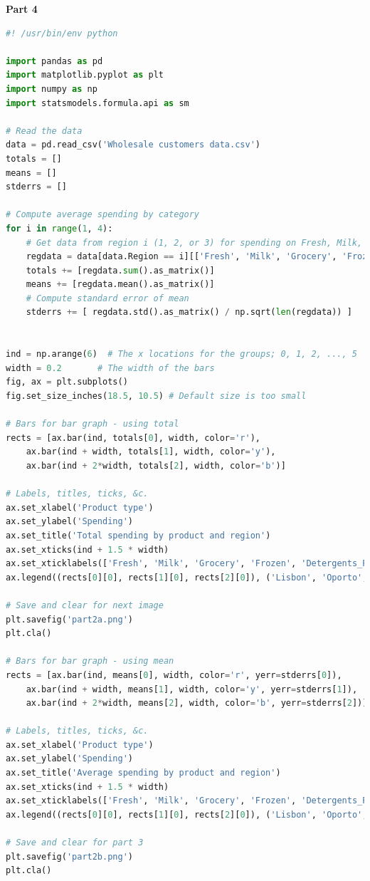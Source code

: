 \documentclass{article}
\begin{document}
	\noindent
	\textbf{Part 4}
	\begin{lstlisting}[language=python]
#! /usr/bin/env python

import pandas as pd
import matplotlib.pyplot as plt
import numpy as np
import statsmodels.formula.api as sm

# Read the data
data = pd.read_csv('Wholesale customers data.csv')
totals = []
means = []
stderrs = []

# Compute average spending by category
for i in range(1, 4):
    # Get data from region i (1, 2, or 3) for spending on Fresh, Milk, &c.
    regdata = data[data.Region == i][['Fresh', 'Milk', 'Grocery', 'Frozen', 'Detergents_Paper', 'Delicassen']]
    totals += [regdata.sum().as_matrix()]
    means += [regdata.mean().as_matrix()]
    # Compute standard error of mean
    stderrs += [ regdata.std().as_matrix() / np.sqrt(len(regdata)) ]


ind = np.arange(6)  # The x locations for the groups; 0, 1, 2, ..., 5
width = 0.2       # The width of the bars
fig, ax = plt.subplots()
fig.set_size_inches(18.5, 10.5) # Default size is too small

# Bars for bar graph - using total
rects = [ax.bar(ind, totals[0], width, color='r'),
    ax.bar(ind + width, totals[1], width, color='y'),
    ax.bar(ind + 2*width, totals[2], width, color='b')]

# Labels, titles, ticks, &c.
ax.set_xlabel('Product type')
ax.set_ylabel('Spending')
ax.set_title('Total spending by product and region')
ax.set_xticks(ind + 1.5 * width)
ax.set_xticklabels(['Fresh', 'Milk', 'Grocery', 'Frozen', 'Detergents_Paper', 'Delicassen'])
ax.legend((rects[0][0], rects[1][0], rects[2][0]), ('Lisbon', 'Oporto', 'Other'))

# Save and clear for next image
plt.savefig('part2a.png')
plt.cla()

# Bars for bar graph - using mean
rects = [ax.bar(ind, means[0], width, color='r', yerr=stderrs[0]),
    ax.bar(ind + width, means[1], width, color='y', yerr=stderrs[1]),
    ax.bar(ind + 2*width, means[2], width, color='b', yerr=stderrs[2])]

# Labels, titles, ticks, &c.
ax.set_xlabel('Product type')
ax.set_ylabel('Spending')
ax.set_title('Average spending by product and region')
ax.set_xticks(ind + 1.5 * width)
ax.set_xticklabels(['Fresh', 'Milk', 'Grocery', 'Frozen', 'Detergents_Paper', 'Delicassen'])
ax.legend((rects[0][0], rects[1][0], rects[2][0]), ('Lisbon', 'Oporto', 'Other'))

# Save and clear for part 3
plt.savefig('part2b.png')
plt.cla()


\end{lstlisting}
\end{document}
